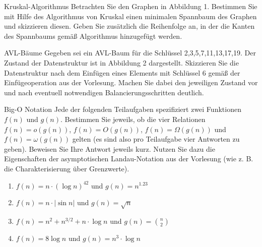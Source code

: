 \documentclass{article}
\begin{document}
\begin{exercise}{Kruskal-Algorithmus}
  Betrachten Sie den Graphen in Abbildung 1. Bestimmen Sie mit Hilfe des Algorithmus von Kruskal einen minimalen Spannbaum des Graphen und skizzieren diesen. Geben Sie zusätzlich die Reihenfolge an, in der die Kanten des Spannbaums gemäß Algorithmus hinzugefügt werden.
  

  \begin{solution}

  \end{solution}
\end{exercise}

\begin{exercise}{AVL-Bäume}
  Gegeben sei ein AVL-Baum für die Schlüssel {2,3,5,7,11,13,17,19}. Der Zustand der Datenstruktur ist in Abbildung 2 dargestellt. Skizzieren Sie die Datenstruktur nach dem Einfügen eines Elements mit Schlüssel 6 gemäß der Einfügeoperation aus der Vorlesung. Machen Sie dabei den jeweiligen Zustand vor und nach eventuell notwendigen Balancierungsschritten deutlich.
  

  \begin{solution}

  \end{solution}
\end{exercise}

\begin{exercise}{Big-O Notation}
  Jede der folgenden Teilaufgaben spezifiziert zwei Funktionen $f(n)$ und $g(n)$. Bestimmen Sie jeweils, ob die vier Relationen $f(n) = o(g(n))$, $f(n) = O(g(n))$, $f(n) = \Omega(g(n))$ und $f(n) = \omega(g(n))$ gelten (es sind also pro Teilaufgabe vier Antworten zu geben). Beweisen Sie Ihre Antwort jeweils kurz. Nutzen Sie dazu die Eigenschaften der asymptotischen Landau-Notation aus der Vorlesung (wie z. B. die Charakterisierung über Grenzwerte).
  \begin{enumerate}
    \item $f(n) = n \cdot (\log n)^{42}$ und $g(n) = n^{1.23}$
    \item $f(n) = n \cdot |\sin n|$ und $g(n) = \sqrt{n}$
    \item $f(n) = n^2 + n^{3/2} + n \cdot \log n$ und $g(n) = \binom{n}{2}$
    \item $f(n) = 8 \log n$ und $g(n) = n^3 \cdot \log n$
  \end{enumerate}

  \begin{solution}

  \end{solution}
\end{exercise}
\end{document}
